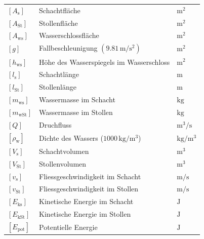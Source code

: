     \renewcommand{\arraystretch}{1.2}
    \begin{tabular}{@{} l p{7cm} l @{}}    
        $[A_{\mathrm{s}}]$      & Schachtfläche \dotfill                                        & $\mathrm{m^2}$ \\
        $[A_{\mathrm{St}}]$     & Stollenfläche \dotfill                                        & $\mathrm{m^2}$ \\
        $[A_{\mathrm{ws}}]$     & Wasserschlossfläche \dotfill                                  & $\mathrm{m^2}$ \\
        $[g]$                   & Fallbeschleunigung $(9.81\, \mathrm{m/s^2})$ \dotfill         & $\mathrm{m^2}$ \\
        $[h_{\mathrm{ws}}]$     & Höhe des Wasserspiegels im Wasserschloss \dotfill             & $\mathrm{m^2}$ \\
        $[l_{\mathrm{s}}]$      & Schachtlänge \dotfill                                         & $\mathrm{m}$ \\
        $[l_{\mathrm{St}}]$     & Stollenlänge \dotfill                                         & $\mathrm{m}$ \\
        $[m_{\mathrm{ws}}]$     & Wassermasse im Schacht \dotfill                               & $\mathrm{kg}$ \\
        $[m_{\mathrm{wSt}}]$    & Wassermasse im Stollen \dotfill                               & $\mathrm{kg}$ \\
        $[Q]$                   & Druchfluss \dotfill                                           &$\mathrm{m^3/s}$\\
        $[\rho_{\mathrm{w}}]$   & Dichte des Wassers ($1000\, \mathrm{kg/m^3}$) \dotfill        & $\mathrm{kg/m^3}$ \\
        $[V_{\mathrm{s}}]$      & Schachtvolumen \dotfill                                       & $\mathrm{m^3}$ \\
        $[V_{\mathrm{St}}]$     & Stollenvolumen \dotfill                                       & $\mathrm{m^3}$ \\
        $[v_{\mathrm{s}}]$      & Fliessgeschwindigkeit im Schacht\dotfill                      & $\mathrm{m/s}$ \\
        $[v_{\mathrm{St}}]$     & Fliessgeschwindigkeit im Stollen \dotfill                     & $\mathrm{m/s}$ \\
        $[E_{\mathrm{ks}}]$     & Kinetische Energie im Schacht \dotfill                        & $\mathrm{J}$\\
        $[E_{\mathrm{kSt}}]$    & Kinetische Energie im Stollen \dotfill                        & $\mathrm{J}$\\
        $[E_{\mathrm{pot}}]$    & Potentielle Energie           \dotfill                        & $\mathrm{J}$\\
    \end{tabular}
    \newcolumn

